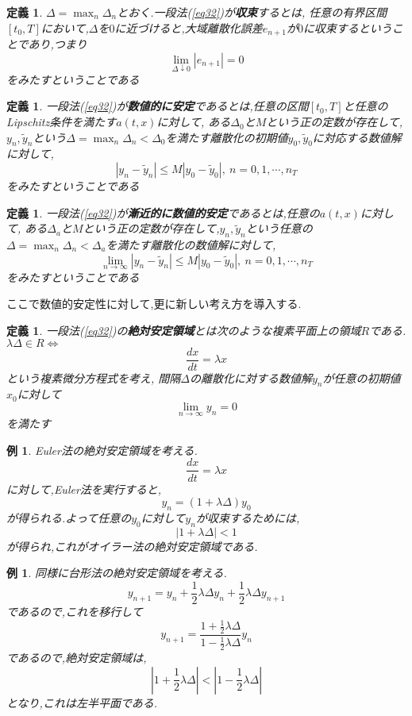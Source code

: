 \documentclass[a4paper,dvipdfmx]{jreport}
\numberwithin{equation}{section}
\newtheorem{Def}     [Thm]{定義}
\newtheorem{Ex}      [Thm]{例}
\renewenvironment{leftbar}{%
  \def\FrameCommand{\vrule width 1pt \hspace{10pt}}%
  \MakeFramed {\advance\hsize-\width \FrameRestore}}%
 {\endMakeFramed}
\def\iff{\Leftrightarrow}
\def\defb{\begin{leftbar}\begin{Def}}
\def\defx{\end{Def}\end{leftbar}}
\def\ex{\begin{Ex}}
\def\exx{\end{Ex}}
\begin{document}
\defb
$\Delta =\max_n \Delta_n$とおく.一段法(\ref{eq32})が{\bf 収束}するとは,
任意の有界区間$[t_0,T]$において,$\Delta$を$0$に近づけると,大域離散化誤差$e_{n+1}$が$0$に収束するということであり,つまり\\
\[
\lim_{\Delta \downarrow 0} |e_{n+1}| = 0
\]
をみたすということである
\defx

\defb
一段法(\ref{eq32})が{\bf 数値的に安定}であるとは,任意の区間$[t_0,T]$と任意のLipschitz条件を満たす$a(t,x)$に対して,
ある$\Delta_0$と$M$という正の定数が存在して,$y_n,\tilde{y}_n$という$\Delta =\max_n \Delta_n < \Delta_0$を満たす離散化の初期値$y_0,\tilde{y}_0$に対応する数値解に対して,
\[
|y_n - \tilde{y}_n | \le M |y_0 - \tilde{y}_0| ,\ n = 0,1,\cdots,n_T
\]
をみたすということである
\defx

\defb
一段法(\ref{eq32})が{\bf 漸近的に数値的安定}であるとは,任意の$a(t,x)$に対して,
ある$\Delta_a$と$M$という正の定数が存在して,$y_n,\tilde{y}_n$という任意の$\Delta =\max_n \Delta_n < \Delta_a$を満たす離散化の数値解に対して,
\[
\lim_{n\to\infty}|y_n - \tilde{y}_n | \le M |y_0 - \tilde{y}_0| ,\ n = 0,1,\cdots,n_T
\]
をみたすということである
\defx

ここで数値的安定性に対して,更に新しい考え方を導入する.
\defb
一段法(\ref{eq32})の{\bf 絶対安定領域}とは次のような複素平面上の領域$R$である.
\\
$\lambda \Delta \in R \iff $
\[
\frac{dx}{dt} = \lambda x
\]
という複素微分方程式を考え,
間隔$\Delta$の離散化に対する数値解$y_n$が任意の初期値$x_0$に対して
\[
\lim_{n\to\infty} y_n = 0
\]
を満たす
\defx
\ex
Euler法の絶対安定領域を考える.\\
\[
\frac{dx}{dt} = \lambda x
\]
に対して,Euler法を実行すると,\\
\[
y_n = (1+\lambda\Delta)y_0
\]
が得られる.よって任意の$y_0$に対して$y_n$が収束するためには,
\[
|1+\lambda\Delta| < 1
\]
が得られ,これがオイラー法の絶対安定領域である.
\exx
\ex
同様に台形法の絶対安定領域を考える.\\
\[
y_{n+1} = y_n + \frac{1}{2} \lambda \Delta y_n +  \frac{1}{2} \lambda \Delta y_{n+1}
\]
であるので,これを移行して
\[
y_{n+1} = \frac{1+ \frac{1}{2} \lambda \Delta}{1- \frac{1}{2} \lambda \Delta}y_n
\]
であるので,絶対安定領域は,
\[
|1+ \frac{1}{2} \lambda \Delta| < |1- \frac{1}{2} \lambda\Delta |
\]
となり,これは左半平面である.
\exx
\end{document}
